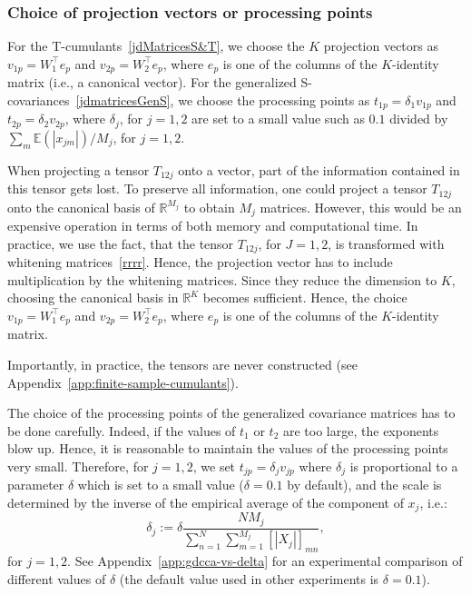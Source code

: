 \documentclass{article}
\newcommand{\R}{\mathbb{R}}
\newcommand{\ebb}{\mathbb{E}}
\begin{document}
\subsubsection{Choice of projection vectors or processing points}
\label{app:processing-projection-points}


For the T-cumulants~\eqref{jdMatricesS&T}, we choose the $K$ projection vectors as $v_{1p}=W_1^{\top}e_p$ and $v_{2p}=W_2^{\top}e_p$, where $e_p$ is one of the columns of the $K$-identity matrix (i.e., a canonical vector). For the generalized S-covariances~\eqref{jdmatricesGenS}, we choose the processing points as $t_{1p} = \delta_1 v_{1p}$ and $t_{2p} = \delta_2 v_{2p}$, where $\delta_j$, for $j=1,2$ are set to a small value such as $0.1$ divided by $\sum_m\ebb(|x_{jm}|)/M_j$, for $j=1,2$. 


When projecting a tensor $T_{12j}$ onto a vector, part of the information contained in this tensor gets lost. To preserve all information, one could project a tensor $T_{12j}$ onto the canonical basis of $\R^{M_j}$ to obtain $M_j$ matrices. However, this would be an expensive operation in terms of both memory and computational time. In practice, we use the fact, that the tensor $T_{12j}$, for $J=1,2$, is transformed with whitening matrices~\eqref{rrrr}. Hence, the projection vector has to include multiplication by the whitening matrices. Since they reduce the dimension to $K$, choosing the canonical basis in $\R^{K}$ becomes sufficient. Hence, the choice $v_{1p} = W_1^{\top} e_p$ and $v_{2p} = W_2^{\top} e_p$, where $e_p$ is one of the columns of the $K$-identity matrix.

Importantly, in practice, the tensors are never constructed (see Appendix~\ref{app:finite-sample-cumulants}). 

The choice of the processing points of the generalized covariance matrices has to be done carefully. Indeed, if the values of $t_1$ or $t_2$ are too large, the exponents blow up. Hence, it is reasonable to maintain the values of the processing points very small. Therefore, for $j=1,2$, we set $t_{jp} = \delta_j v_{jp}$ where $\delta_j$ is proportional to a parameter $\delta$ which is set to a small value ($\delta = 0.1$ by default), and the scale is determined by the inverse of the empirical average of the component of $x_j$, i.e.: 
\begin{equation} \label{eq:delta_j}
\delta_j := \delta \frac{ N M_j }{\sum_{n=1}^N \sum_{m=1}^{M_j} [ |X_j| ]_{mn}},
\end{equation}
for $j=1,2$. See Appendix~\ref{app:gdcca-vs-delta} for an experimental comparison of different values of $\delta$ (the default value used in other experiments is $\delta=0.1$).
\end{document}
